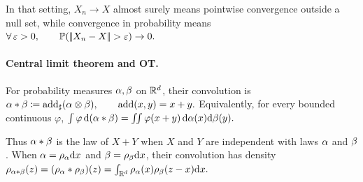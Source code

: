 In that setting, $X_n\to X$ almost surely means pointwise convergence outside a null set, while convergence in probability means
\(\foralls \epsilon>0,\qquad \PP(\norm{X_n-X}>\epsilon)\to0.\)
\paragraph{Central limit theorem and OT.}
\begin{defn}\label{def-measure-convolution}
For probability measures $\alpha,\beta$ on $\mathbb{R}^d$, their convolution is \(\alpha*\beta\coloneqq\operatorname{add}_\sharp(\alpha\otimes\beta), \qquad \operatorname{add}(x,y)=x+y.\)
Equivalently, for every bounded continuous $\varphi$, \(\int\varphi\,\mathrm{d}(\alpha*\beta) = \iint\varphi(x+y)\,\mathrm{d}\alpha(x)\mathrm{d}\beta(y).\)
\end{defn}
Thus $\alpha*\beta$ is the law of $X+Y$ when $X$ and $Y$ are independent with laws $\alpha$ and $\beta$. When $\alpha=\rho_{\alpha}\mathrm{d} x$ and $\beta=\rho_{\beta}\mathrm{d} x$, their convolution has density
\(\rho_{\alpha*\beta}(z) = (\rho_{\alpha}*\rho_{\beta})(z) = \int_{\mathbb{R}^d}\rho_{\alpha}(x)\rho_{\beta}(z-x)\mathrm{d} x.\)
